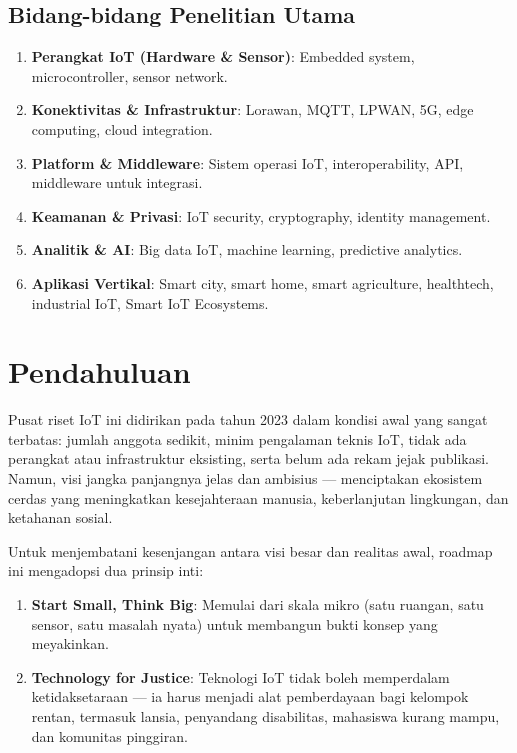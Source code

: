 \documentclass[11pt,a4paper]{article}
\begin{document}
\subsection{Bidang-bidang Penelitian Utama}
\begin{enumerate}
    \item \textbf{Perangkat IoT (Hardware \& Sensor)}: Embedded system, microcontroller, sensor network.
    \item \textbf{Konektivitas \& Infrastruktur}: Lorawan, MQTT, LPWAN, 5G, edge computing, cloud integration.
    \item \textbf{Platform \& Middleware}: Sistem operasi IoT, interoperability, API, middleware untuk integrasi.
    \item \textbf{Keamanan \& Privasi}: IoT security, cryptography, identity management.
    \item \textbf{Analitik \& AI}: Big data IoT, machine learning, predictive analytics.
    \item \textbf{Aplikasi Vertikal}: Smart city, smart home, smart agriculture, healthtech, industrial IoT, Smart IoT Ecosystems.
\end{enumerate}



\section{Pendahuluan}

Pusat riset IoT ini didirikan pada tahun 2023 dalam kondisi awal yang sangat terbatas: jumlah anggota sedikit, minim pengalaman teknis IoT, tidak ada perangkat atau infrastruktur eksisting, serta belum ada rekam jejak publikasi. Namun, visi jangka panjangnya jelas dan ambisius — menciptakan ekosistem cerdas yang meningkatkan kesejahteraan manusia, keberlanjutan lingkungan, dan ketahanan sosial.

Untuk menjembatani kesenjangan antara visi besar dan realitas awal, roadmap ini mengadopsi dua prinsip inti:
\begin{enumerate}[leftmargin=*]
    \item \textbf{Start Small, Think Big}: Memulai dari skala mikro (satu ruangan, satu sensor, satu masalah nyata) untuk membangun bukti konsep yang meyakinkan.
    \item \textbf{Technology for Justice}: Teknologi IoT tidak boleh memperdalam ketidaksetaraan — ia harus menjadi alat pemberdayaan bagi kelompok rentan, termasuk lansia, penyandang disabilitas, mahasiswa kurang mampu, dan komunitas pinggiran.
\end{enumerate}
\end{document}
